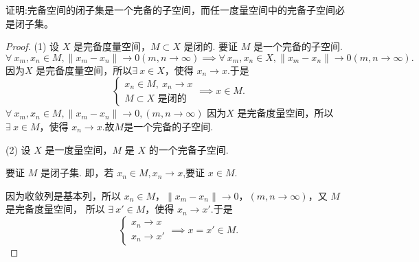 \documentclass[../../main.tex]{subfiles}
\begin{document}
\begin{proposition}\label{proposition:习题1.1.1}
证明:完备空间的闭子集是一个完备的子空间，而任一度量空间中的完备子空间必是闭子集。
\end{proposition}
\begin{proof}
(1) 设 \( X \) 是完备度量空间，\( M \subset X \) 是闭的. 要证 \( M \) 是一个完备的子空间.
\[
\forall\ x_m, x_n \in M ,\|x_m - x_n\| \to 0 (m, n \to \infty)\implies \forall\ x_m, x_n \in X , \|x_m - x_n\| \to 0 (m, n \to \infty).
\]
因为\(X \) 是完备度量空间，所以\( \exists\ x \in X \)，使得 \( x_n \to x \).于是
\[
\begin{cases} 
x_n \in M,\ x_n \to x \\
M \subset X \text{ 是闭的}
\end{cases} \implies x \in M.
\]
\( \forall\ x_m, x_n \in M, \|x_m - x_n\| \to 0, (m, n \to \infty) \)
因为\(X \) 是完备度量空间，所以
\( \exists\ x \in M \)，使得 \( x_n \to x \).故$M$是一个完备的子空间.

(2) 设 \( X \) 是一度量空间，\( M \) 是 \( X \) 的一个完备子空间.

要证 \( M \) 是闭子集. 即，若 \( x_n \in M, x_n \to x \),要证 \( x \in M \).

因为收敛列是基本列，所以
\( x_n \in M \)，\( \|x_m - x_n\| \to 0 \)，\( (m, n \to \infty) \)，又 \( M \) 是完备度量空间，
所以 \( \exists\ x' \in M \)，使得 \( x_n \to x' \).于是
\[
\begin{cases} 
x_n \to x \\
x_n \to x'
\end{cases} \implies x = x' \in M.
\]
\end{proof}
\end{document}
